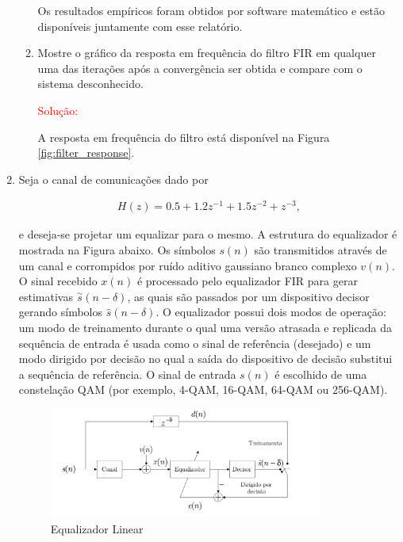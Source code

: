 \documentclass[a4paper,10pt]{article}
\begin{document}
\begin{enumerate}
\begin{enumerate}
						Os resultados empíricos foram obtidos por software matemático e estão disponíveis juntamente com esse relatório.

					\item Mostre o gráﬁco da resposta em frequência do ﬁltro FIR em qualquer uma das iterações após a convergência ser obtida e compare com o sistema desconhecido.
					
						\textcolor{red}{Solução:}

						A resposta em frequência do filtro está disponível na Figura \ref{fig:filter_response}. 

				\end{enumerate}
			
			\item Seja o canal de comunicações dado por
			
				\begin{align}
					H(z) = 0.5 + 1.2z^{-1} + 1.5z^{-2} + z^{-3},
				\end{align}
				
				e deseja-se projetar um equalizar para o mesmo. A estrutura do equalizador é mostrada na Figura abaixo. Os símbolos $s(n)$ são transmitidos através de um canal e corrompidos por ruído aditivo gaussiano branco complexo $v(n)$. O sinal recebido $x(n)$ é processado pelo equalizador FIR para gerar estimativas $\overset{\sim}{s}(n - \delta)$, as quais são passados por um dispositivo decisor gerando  símbolos $\hat{s}(n - \delta)$. O equalizador possui dois modos de operação: um modo de treinamento durante o qual uma versão atrasada e  replicada da sequência de entrada é usada como o sinal de referência (desejado) e um modo dirigido por decisão no qual a saída do dispositivo de decisão substitui a sequência de referência. O sinal de entrada $s(n)$ é escolhido de uma constelação QAM (por exemplo, 4-QAM, 16-QAM, 64-QAM ou 256-QAM).
				
				\begin{figure}[!ht]
					\centering
					\includegraphics[width=0.85\textwidth]{figs/equalizador_linear.png}
					\caption{Equalizador Linear}
				\end{figure}
			

\end{enumerate}
\end{document}
